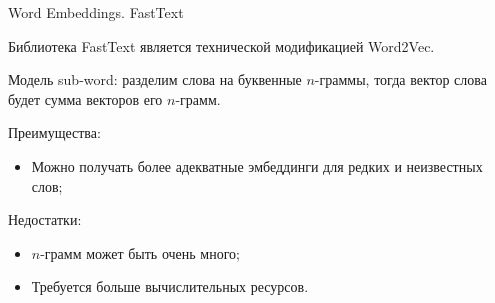 \documentclass[notheorems, handout, 10pt]{beamer}
\begin{document}
	\begin{frame}{Word Embeddings. FastText}
		
		Библиотека FastText является технической модификацией Word2Vec.
		
		\vspace{0.2cm}
		
		Модель sub-word: разделим слова на буквенные $n$-граммы, тогда вектор слова будет сумма векторов его $n$-грамм.
		
		\vspace{0.2cm}
		
		Преимущества:
		\begin{itemize}
			\item Можно получать более адекватные эмбеддинги для редких и неизвестных слов;
		\end{itemize}
		
		\vspace{0.2cm}
		
		Недостатки:
		\begin{itemize}
			\item $n$-грамм может быть очень много;
			\item Требуется больше вычислительных ресурсов.
		\end{itemize}
		
		\note{
			
		}
		
	\end{frame}
	
\end{document}
